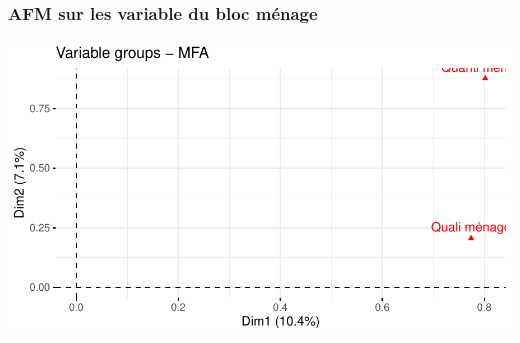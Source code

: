 \documentclass[11pt,a4paper, x11names]{article}\usepackage[]{graphicx}\usepackage[]{color}
\makeatletter
\def\maxwidth{ %
  \ifdim\Gin@nat@width>\linewidth
    \linewidth
  \else
    \Gin@nat@width
  \fi
}
\newenvironment{knitrout}{}{} %
\makeatother
\begin{document}
\subsubsection{AFM sur les variable du bloc ménage}
\begin{minipage}{0.49\linewidth}
\begin{mdframed}
\begin{knitrout}
\color{fgcolor}
\includegraphics[width=\maxwidth]{figure/unnamed-chunk-8-1} 
\end{knitrout}

\end{mdframed}
\end{minipage}


\end{document}

